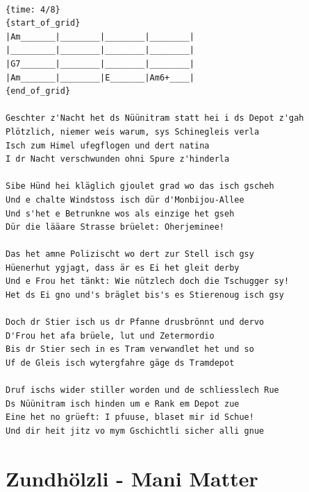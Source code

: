 \documentclass[
]{book}
\let\stdsection\section
\renewcommand\section{\clearpage\stdsection}
\begin{document}
\begin{verbatim}

{time: 4/8}
{start_of_grid}
|Am_______|________|________|________|
|_________|________|________|________|
|G7_______|________|________|________|
|Am_______|________|E_______|Am6+____|
{end_of_grid}

Geschter z'Nacht het ds Nüünitram statt hei i ds Depot z'gah
Plötzlich, niemer weis warum, sys Schinegleis verla
Isch zum Himel ufegflogen und dert natina
I dr Nacht verschwunden ohni Spure z'hinderla

Sibe Hünd hei kläglich gjoulet grad wo das isch gscheh
Und e chalte Windstoss isch dür d'Monbijou-Allee
Und s'het e Betrunkne wos als einzige het gseh
Dür die lääare Strasse brüelet: Oherjeminee!

Das het amne Polizischt wo dert zur Stell isch gsy
Hüenerhut ygjagt, dass är es Ei het gleit derby
Und e Frou het tänkt: Wie nützlech doch die Tschugger sy!
Het ds Ei gno und's bräglet bis's es Stierenoug isch gsy

Doch dr Stier isch us dr Pfanne drusbrönnt und dervo
D'Frou het afa brüele, lut und Zetermordio
Bis dr Stier sech in es Tram verwandlet het und so
Uf de Gleis isch wytergfahre gäge ds Tramdepot

Druf ischs wider stiller worden und de schliesslech Rue
Ds Nüünitram isch hinden um e Rank em Depot zue
Eine het no grüeft: I pfuuse, blaset mir id Schue!
Und dir heit jitz vo mym Gschichtli sicher alli gnue

\end{verbatim}

\hypertarget{zundhuxf6lzli---mani-matter}{%
\section{Zundhölzli - Mani Matter}\label{zundhuxf6lzli---mani-matter}}
\end{document}
